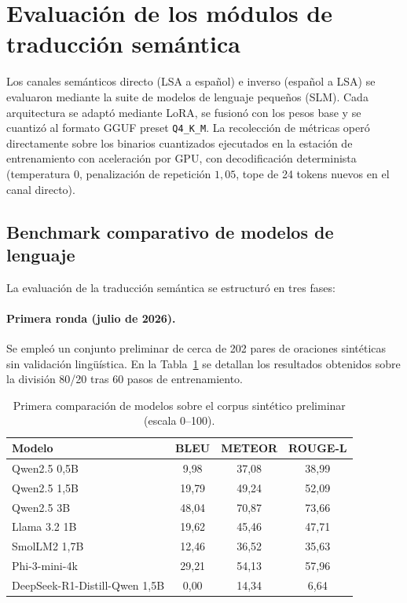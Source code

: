 \section{Evaluación de los módulos de traducción semántica}

Los canales semánticos directo (LSA a español) e inverso (español a LSA) se evaluaron mediante la suite de modelos de lenguaje pequeños (SLM). Cada arquitectura se adaptó mediante LoRA, se fusionó con los pesos base y se cuantizó al formato GGUF preset \texttt{Q4\_K\_M}. La recolección de métricas operó directamente sobre los binarios cuantizados ejecutados en la estación de entrenamiento con aceleración por GPU, con decodificación determinista (temperatura $0$, penalización de repetición $1{,}05$, tope de 24 tokens nuevos en el canal directo).

\subsection{Benchmark comparativo de modelos de lenguaje}
La evaluación de la traducción semántica se estructuró en tres fases:

\paragraph{Primera ronda (julio de 2026).}
Se empleó un conjunto preliminar de cerca de 202 pares de oraciones sintéticas sin validación lingüística. En la Tabla~\ref{tab:slm_julio} se detallan los resultados obtenidos sobre la división 80/20 tras 60 pasos de entrenamiento.

\begin{table}[H]
    \centering
    \small
    \caption{Primera comparación de modelos sobre el corpus sintético preliminar (escala 0--100).}
    \label{tab:slm_julio}
    \begin{tabular}{lccc}
        \toprule
        \textbf{Modelo} & \textbf{BLEU} & \textbf{METEOR} & \textbf{ROUGE-L} \\
        \midrule
        Qwen2.5 0,5B & 9{,}98 & 37{,}08 & 38{,}99 \\
        Qwen2.5 1,5B & 19{,}79 & 49{,}24 & 52{,}09 \\
        Qwen2.5 3B & 48{,}04 & 70{,}87 & 73{,}66 \\
        Llama 3.2 1B & 19{,}62 & 45{,}46 & 47{,}71 \\
        SmolLM2 1,7B & 12{,}46 & 36{,}52 & 35{,}63 \\
        Phi-3-mini-4k & 29{,}21 & 54{,}13 & 57{,}96 \\
        DeepSeek-R1-Distill-Qwen 1,5B & 0{,}00 & 14{,}34 & 6{,}64 \\
        \bottomrule
    \end{tabular}
\end{table}

